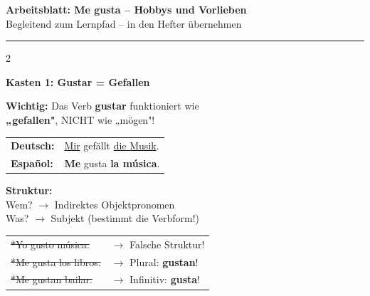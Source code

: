 \documentclass[10pt, a4paper]{article}
\newcommand{\fachfarbe}{spanisch}
\newcommand{\thema}{Me gusta}
\newcommand{\es}[1]{\textcolor{\fachfarbe}{\textbf{#1}}}
\newcommand{\abschnitt}[1]{%
    \vspace{8pt}
    \noindent\textbf{\textcolor{\fachfarbe}{#1}}
    \vspace{4pt}
}
\begin{document}

\begin{center}
{\large\bfseries Arbeitsblatt: \thema{} -- Hobbys und Vorlieben}\\[2pt]
{\small\textcolor{grau}{Begleitend zum Lernpfad -- in den Hefter übernehmen}}
\end{center}

\vspace{-2pt}
\hrule
\vspace{8pt}


\begin{multicols}{2}
\small


\abschnitt{Kasten 1: Gustar = Gefallen}

\begin{grammatik}
\textbf{Wichtig:} Das Verb \es{gustar} funktioniert wie\\
\textbf{„gefallen"}, NICHT wie „mögen"!

\vspace{6pt}

\begin{tabular}{@{}l@{ }l@{}}
\textbf{Deutsch:} & \underline{Mir} gefällt \underline{die Musik}. \\[2pt]
\textbf{Español:} & \es{Me} gusta \es{la música}. \\
\end{tabular}

\vspace{6pt}

\textbf{Struktur:}\\
Wem? $\rightarrow$ Indirektes Objektpronomen\\
Was? $\rightarrow$ Subjekt (bestimmt die Verbform!)
\end{grammatik}

\vspace{4pt}

\begin{fehlerbox}
\begin{tabular}{@{}l@{ }l@{}}
\textcolor{fehler}{\sout{*Yo gusto música.}} & $\rightarrow$ Falsche Struktur! \\
\textcolor{fehler}{\sout{*Me gusta los libros.}} & $\rightarrow$ Plural: \es{gustan}! \\
\textcolor{fehler}{\sout{*Me gustan bailar.}} & $\rightarrow$ Infinitiv: \es{gusta}! \\
\end{tabular}
\end{fehlerbox}


\end{multicols}
\end{document}
